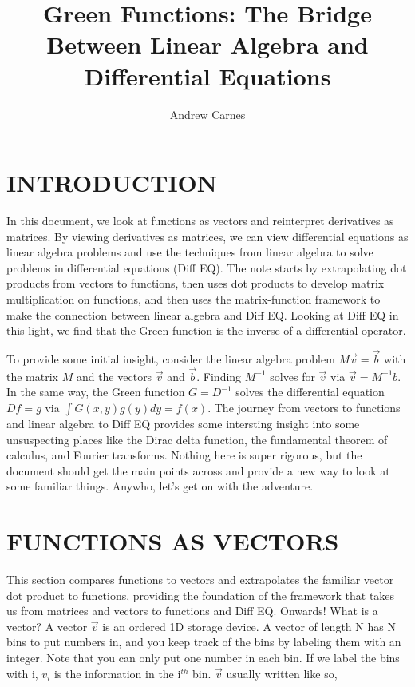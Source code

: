 \documentclass[12pt]{article}
\begin{document}
\title{Green Functions: The Bridge Between Linear Algebra and Differential Equations}
\author{Andrew Carnes}

\maketitle

\newpage
\tableofcontents
\newpage

\section{INTRODUCTION} \label{intro}

In this document, we look at functions as vectors and reinterpret derivatives as matrices. By viewing derivatives as matrices, we can view differential equations as linear algebra problems and use the techniques from linear algebra to solve problems in differential equations (Diff EQ). The note starts by extrapolating dot products from vectors to functions, then uses dot products to develop matrix multiplication on functions, and then uses the matrix-function framework to make the connection between linear algebra and Diff EQ. Looking at Diff EQ in this light, we find that the Green function is the inverse of a differential operator. 

To provide some initial insight, consider the linear algebra problem $M\vec{v}=\vec{b}$ with the matrix $M$ and the vectors $\vec{v}$ and $\vec{b}$. Finding $M^{-1}$ solves for $\vec{v}$ via $\vec{v}=M^{-1}b$. In the same way, the Green function $G=D^{-1}$ solves the differential equation $Df=g$ via $\int G(x,y)g(y)dy = f(x)$. The journey from vectors to functions and linear algebra to Diff EQ provides some intersting insight into some unsuspecting places like the Dirac delta function, the fundamental theorem of calculus, and Fourier transforms. Nothing here is super rigorous, but the document should get the main points across and provide a new way to look at some familiar things. Anywho, let's get on with the adventure.

\section{FUNCTIONS AS VECTORS}  

This section compares functions to vectors and extrapolates the familiar vector dot product to functions, providing the foundation of the framework that takes us from matrices and vectors to functions and Diff EQ. Onwards! What is a vector? A vector $\vec{v}$ is an ordered 1D storage device. A vector of length N has N bins to put numbers in, and you keep track of the bins by labeling them with an integer. Note that you can only put one number in each bin. If we label the bins with i, $v_i$ is the information in the i$^{th}$ bin. $\vec{v}$ usually written like so, 
\end{document}
